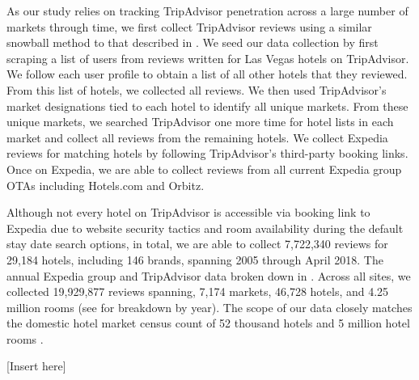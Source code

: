 \documentclass[mksc,blindrev]{informs3} %
\begin{document}

As our study relies on tracking TripAdvisor penetration across a large number of markets through time, we first collect TripAdvisor reviews using a similar snowball method to that described in \citet{wang2018and}. We seed our data collection by first scraping a list of users from reviews written for Las Vegas hotels on TripAdvisor. We follow each user profile to obtain a list of all other hotels that they reviewed. From this list of hotels, we collected all reviews. We then used TripAdvisor's market designations tied to each hotel to identify all unique markets. From these unique markets, we searched TripAdvisor one more time for hotel lists in each market and collect all reviews from the remaining hotels. We collect Expedia reviews for matching hotels by following TripAdvisor's third-party booking links. Once on Expedia, we are able to collect reviews from all current Expedia group OTAs including Hotels.com and Orbitz.

Although not every hotel on TripAdvisor is accessible via booking link to Expedia due to website security tactics and room availability during the default stay date search options, in total, we are able to collect 7,722,340 reviews for 29,184 hotels, including 146 brands, spanning 2005 through April 2018. The annual Expedia group and TripAdvisor data broken down in . Across all sites, we collected 19,929,877 reviews spanning, 7,174 markets, 46,728 hotels, and 4.25 million rooms (see  for breakdown by year). The scope of our data closely matches the domestic hotel market census count of 52 thousand hotels and 5 million hotel rooms \citep{hotelnews2015}. 


[Insert  here]
\end{document}
